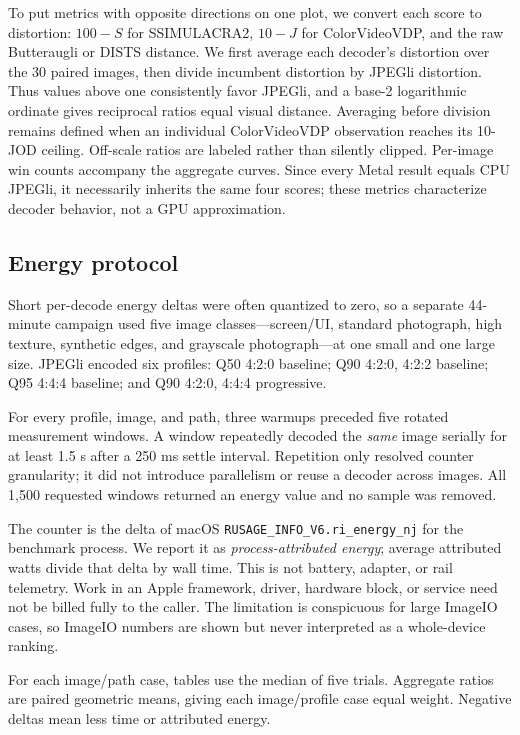 \documentclass[10pt,twocolumn]{article}
\begin{document}
To put metrics with opposite directions on one plot, we convert each score to
distortion: $100-S$ for SSIMULACRA2, $10-J$ for ColorVideoVDP, and the raw
Butteraugli or DISTS distance.  We first average each decoder's distortion
over the 30 paired images, then divide incumbent distortion by JPEGli
distortion.  Thus values above one consistently favor JPEGli, and a base-2
logarithmic ordinate gives reciprocal ratios equal visual distance.  Averaging
before division remains defined when an individual ColorVideoVDP observation
reaches its 10-JOD ceiling.  Off-scale ratios are labeled rather than silently clipped.
Per-image win counts accompany the aggregate curves.  Since every Metal result
equals CPU JPEGli, it necessarily inherits the same four scores; these metrics
characterize decoder behavior, not a GPU approximation.

\subsection{Energy protocol}
\label{sec:energy-method}

Short per-decode energy deltas were often quantized to zero, so a separate
44-minute campaign used five image classes---screen/UI, standard photograph,
high texture, synthetic edges, and grayscale photograph---at one small and
one large size.  JPEGli encoded six profiles: Q50 4:2:0 baseline; Q90 4:2:0,
4:2:2 baseline; Q95 4:4:4 baseline; and Q90 4:2:0, 4:4:4 progressive.

For every profile, image, and path, three warmups preceded five rotated
measurement windows.  A window repeatedly decoded the \emph{same} image
serially for at least 1.5 s after a 250 ms settle interval.  Repetition only
resolved counter granularity; it did not introduce parallelism or reuse a
decoder across images.  All 1,500 requested windows returned an energy value
and no sample was removed.

The counter is the delta of macOS
\nolinkurl{RUSAGE_INFO_V6.ri_energy_nj} for the benchmark process.  We report it
as \emph{process-attributed energy}; average attributed watts divide that
delta by wall time.  This is not battery, adapter, or rail telemetry.  Work in
an Apple framework, driver, hardware block, or service need not be billed
fully to the caller.  The limitation is conspicuous for large ImageIO cases,
so ImageIO numbers are shown but never interpreted as a whole-device ranking.

For each image/path case, tables use the median of five trials.  Aggregate
ratios are paired geometric means, giving each image/profile case equal
weight.  Negative deltas mean less time or attributed energy.
\end{document}
